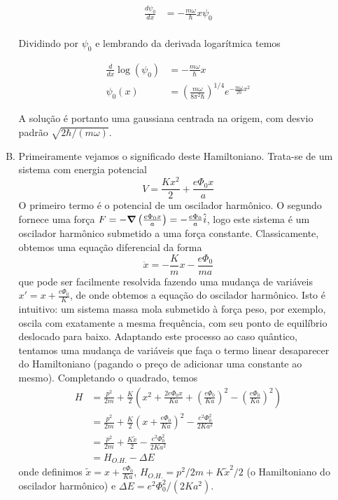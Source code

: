 \documentclass[a4paper, 12pt, notitlepage]{article}
\begin{document}
\begin{enumerate}
\begin{enumerate}[(A)]
  \begin{align*}
  \frac{d\psi_0}{dx} &= -\frac{m\omega}{\hbar} x \psi_0 \\
  \end{align*}
  
  Dividindo por $\psi_0$ e lembrando da derivada logarítmica temos
  
  \begin{align*}
  \frac{d}{dx} \log(\psi_0) &= -\frac{m\omega}{\hbar} x \\
  \psi_0(x) &= \left(\frac{m\omega}{8\pi^2\hbar}\right)^{1/4}e^{-\frac{m\omega}{2\hbar} x^2}
  \end{align*}
  
  A solução é portanto uma gaussiana centrada na origem, com desvio padrão $\sqrt{2\hbar/(m\omega)}$. 
  
  \item Primeiramente vejamos o significado deste Hamiltoniano. Trata-se de um sistema com energia potencial
  \begin{equation*}
    V = \frac{Kx^2}{2} + \frac{e\Phi_0 x}{a}
  \end{equation*}
  O primeiro termo é o potencial de um oscilador harmônico. O segundo fornece uma força $F = -\grad\left(\frac{e\Phi_0 x}{a}\right) = -\frac{e\Phi_0}{a} \hat{i}$, logo este sistema é um oscilador harmônico submetido a uma força constante. Classicamente, obtemos uma equação diferencial da forma
  \[
    \ddot{x} = -\frac{K}{m}x - \frac{e\Phi_0}{ma}
  \]
  que pode ser facilmente resolvida fazendo uma mudança de variáveis $x' = x + \frac{e\Phi_0}{K}$, de onde obtemos a equação do oscilador harmônico. Isto é intuitivo: um sistema massa mola submetido à força peso, por exemplo, oscila com exatamente a mesma frequência, com seu ponto de equilíbrio deslocado para baixo.
  Adaptando este processo ao caso quântico, tentamos uma mudança de variáveis que faça o termo linear desaparecer do Hamiltoniano (pagando o preço de adicionar uma constante ao mesmo). Completando o quadrado, temos
  \begin{align*}
    H &= \frac{p^2}{2m} + \frac{K}{2}\left(x^2 + \frac{2e\Phi_0x}{Ka} + \left(\frac{e\Phi_0}{Ka}\right)^2 - \left(\frac{e\Phi_0}{Ka}\right)^2\right) \\
    &= \frac{p^2}{2m} + \frac{K}{2}\left(x + \frac{e\Phi_0}{Ka}\right)^2 - \frac{e^2 \Phi_0^2}{2Ka^2} \\
    &= \frac{p^2}{2m} + \frac{K\tilde{x}}{2} - \frac{e^2 \Phi_0^2}{2Ka^2} \\
    &= H_{O.H.} - \Delta E
  \end{align*}
  \noindent onde definimos $\tilde{x} = x + \frac{e\Phi_0}{Ka}$, $H_{O.H.} = p^2/2m + K\tilde{x}^2/2$ (o Hamiltoniano do oscilador harmônico) e $\Delta E = e^2 \Phi_0^2/(2Ka^2)$.
  

\end{enumerate}
\end{enumerate}
\end{document}
